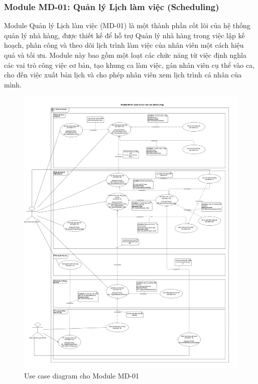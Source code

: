 \subsubsection{Module MD-01: Quản lý Lịch làm việc (Scheduling)}

Module Quản lý Lịch làm việc (MD-01) là một thành phần cốt lõi của hệ thống quản lý nhà hàng, được thiết kế để hỗ trợ Quản lý nhà hàng trong việc lập kế hoạch, phân công và theo dõi lịch trình làm việc của nhân viên một cách hiệu quả và tối ưu. Module này bao gồm một loạt các chức năng từ việc định nghĩa các vai trò công việc cơ bản, tạo khung ca làm việc, gán nhân viên cụ thể vào ca, cho đến việc xuất bản lịch và cho phép nhân viên xem lịch trình cá nhân của mình.

\begin{figure}[H]
    \centering
    \includegraphics[width=15cm]{Sections/tong_quan/functional_spec/img/uc1.png}
    \vspace{0.5cm}
    \caption{Use case diagram cho Module MD-01}
    \label{fig:my_label}
\end{figure}

